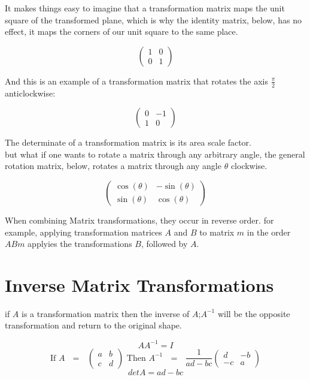 \documentclass{article}
\begin{document}
It makes things easy to imagine that a transformation matrix maps the unit square of the transformed plane, which is why the identity matrix, below,  has no effect, it maps the corners of our unit square to the same place.

\[\left(\begin{array}{cc} 1 & 0 \\ 0 & 1 \end{array}\right)\]

And this is an example of a transformation matrix that rotates the axis \(\frac{\pi}{2}\) anticlockwise:

\[\left(\begin{array}{cc} 0 & -1 \\ 1 & 0 \end{array}\right)\]

The determinate of a transformation matrix is its area scale factor. \\ but what if one wants to rotate a matrix through any arbitrary angle, the general rotation matrix, below, rotates a matrix through any angle \(\theta\) clockwise.

\[\left(\begin{array}{cc} \cos\left(\theta\right) & -\sin\left(\theta\right) \\ \sin\left(\theta\right) & \cos\left(\theta\right) \end{array}\right)\]

When combining Matrix transformations, they occur in reverse order. for example, applying transformation matrices \(A\) and \(B\) to matrix \(m\) in the order \(ABm\) applyies the transformations \(B\), followed by \(A\).

\section{Inverse Matrix Transformations}

if \(A\) is a transformation matrix then the inverse of \(A\);\(A^{-1}\) will be the opposite transformation and return to the original shape.

\[AA^{-1}=I\]
\[\text{If \(A\) \(=\) }\left(\begin{array}{cc} a & b \\ c & d \end{array}\right) \text{  Then \(A^{-1}\) \(=\) } \frac{1}{ad-bc}\left(\begin{array}{cc} d & -b \\ -c & a \end{array}\right)\]
\[detA=ad-bc\]
\end{document}
